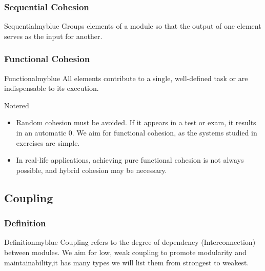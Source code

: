 \vspace{0.25cm}

\subsubsection*{Sequential Cohesion}
\begin{prettyBox}{Sequential}{myblue}
Groups elements of a module so that the output of one element serves as
the input for another.
\end{prettyBox}
\vspace{0.25cm}

\subsubsection*{Functional Cohesion}
\begin{prettyBox}{Functional}{myblue}
All elements contribute to a single, well-defined task or are indispensable to its execution.
\end{prettyBox}

\vspace{1cm}

\begin{prettyBox}{Note}{red}
\begin{itemize}
    \item Random cohesion must be avoided. If it appears in a test or exam, it results in an automatic 0. We aim for functional cohesion, as the systems studied in exercises are simple.  
    \item In real-life applications, achieving pure functional cohesion is not always possible, and hybrid cohesion may be necessary.  
\end{itemize}
\end{prettyBox}

\newpage
\null
\subsection{Coupling}
\subsubsection{Definition}
\begin{prettyBox}{Definition}{myblue}
Coupling refers to the degree of dependency (Interconnection) between modules. We 
aim for low, weak coupling to promote modularity and maintainability,it has many types we
will list them from strongest to weakest.
\end{prettyBox}
\vspace{0.35cm}

